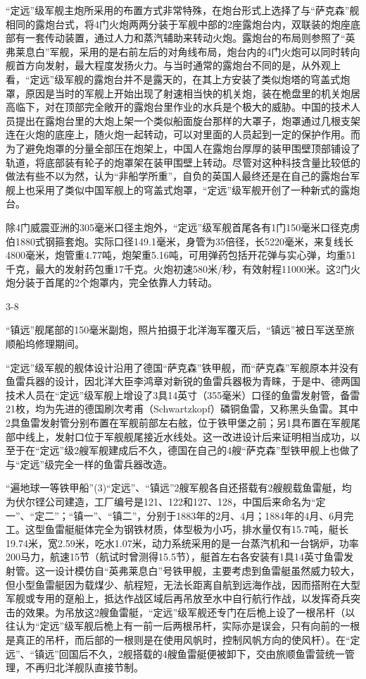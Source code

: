 \documentclass[12pt,UTF8]{ctexbook}
\begin{document}
“定远”级军舰主炮所采用的布置方式非常特殊，在炮台形式上选择了与“萨克森”舰相同的露炮台式，将4门火炮两两分装于军舰中部的2座露炮台内，双联装的炮座底部有一套传动装置，通过人力和蒸汽辅助来转动火炮。露炮台的布局则参照了“英弗莱息白”军舰，采用的是右前左后的对角线布局，炮台内的4门火炮可以同时转向舰首方向发射，最大程度发扬火力。与当时通常的露炮台不同的是，从外观上看，“定远”级军舰的露炮台并不是露天的，在其上方安装了类似炮塔的穹盖式炮罩，原因是当时的军舰上开始出现了射速相当快的机关炮，装在桅盘里的机关炮居高临下，对在顶部完全敞开的露炮台里作业的水兵是个极大的威胁。中国的技术人员提出在露炮台里的大炮上架一个类似船面旋台那样的大罩子，炮罩通过几根支架连在火炮的底座上，随火炮一起转动，可以对里面的人员起到一定的保护作用。而为了避免炮罩的分量全部压在炮架上，中国人在露炮台厚厚的装甲围壁顶部铺设了轨道，将底部装有轮子的炮罩架在装甲围壁上转动。尽管对这种科技含量比较低的做法有些不以为然，认为“非船学所重”，自负的英国人最终还是在自己的露炮台军舰上也采用了类似中国军舰上的穹盖式炮罩，“定远”级军舰开创了一种新式的露炮台。

除4门威震亚洲的305毫米口径主炮外，“定远”级军舰首尾各有1门150毫米口径克虏伯1880式钢箍套炮。实际口径149.1毫米，身管为35倍径，长5220毫米，来复线长4800毫米，炮管重4.77吨，炮架重5.16吨，可用弹药包括开花弹与实心弹，均重51千克，最大的发射药包重17千克。火炮初速580米/秒，有效射程11000米。这2门火炮分装于首尾的2个炮罩内，完全依靠人力转动。

3-8

“镇远”舰尾部的150毫米副炮，照片拍摄于北洋海军覆灭后，“镇远”被日军送至旅顺船坞修理期间。

“定远”级军舰的舰体设计沿用了德国“萨克森”铁甲舰，而“萨克森”军舰原本并没有鱼雷兵器的设计，因北洋大臣李鸿章对新锐的鱼雷兵器极为青睐，于是中、德两国技术人员在“定远”级军舰上增设了3具14英寸（355毫米）口径的鱼雷发射管，备雷21枚，均为先进的德国刷次考甫（Schwartzkopf）磷铜鱼雷，又称黑头鱼雷。其中2具鱼雷发射管分别布置在军舰前部左右舷，位于铁甲堡之前；另1具布置在军舰尾部中线上，发射口位于军舰舰尾接近水线处。这一改进设计后来证明相当成功，以至于在“定远”级2艘军舰建成后不久，德国在自己的4艘“萨克森”型铁甲舰上也做了与“定远”级完全一样的鱼雷兵器改造。

“遍地球一等铁甲船”(3)“定远”、“镇远”2艘军舰各自还搭载有2艘舰载鱼雷艇，均为伏尔铿公司建造，工厂编号是121、122和127、128，中国后来命名为“定一”、“定二”；“镇一”、“镇二”，分别于1883年的2月、4月；1884年的4月、6月完工。这型鱼雷艇艇体完全为钢铁材质，体型极为小巧，排水量仅有15.7吨，艇长19.74米，宽2.59米，吃水1.07米，动力系统采用的是一台蒸汽机和一台锅炉，功率200马力，航速15节（航试时曾测得15.5节），艇首左右各安装有1具14英寸鱼雷发射管。这一设计模仿自“英弗莱息白”号铁甲舰，主要考虑到鱼雷艇虽然威力较大，但小型鱼雷艇因为载煤少、航程短，无法长距离自航到远海作战，因而搭附在大型军舰或专用的趸船上，抵达作战区域后再吊放至水中自行航行作战，以发挥奇兵突击的效果。为吊放这2艘鱼雷艇，“定远”级军舰还专门在后桅上设了一根吊杆（以往认为“定远”级军舰后桅上有一前一后两根吊杆，实际亦是误会，只有向前的一根是真正的吊杆，而后部的一根则是在使用风帆时，控制风帆方向的使风杆）。在“定远”、“镇远”回国后不久，2舰搭载的4艘鱼雷艇便被卸下，交由旅顺鱼雷营统一管理，不再归北洋舰队直接节制。
\end{document}
